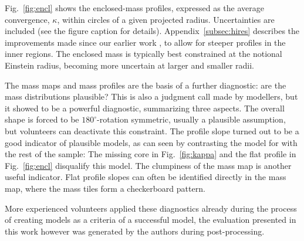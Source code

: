 Fig.~\ref{fig:encl} shows the enclosed-mass profiles, expressed as the
average convergence, $\kappa$, within circles of a given projected
radius.  Uncertainties are included (see the figure caption for
details).
Appendix~\ref{subsec:hires} describes the improvements made
since our earlier work \citep{2015MNRAS.447.2170K}, to allow for
steeper profiles in the inner regions.  The enclosed mass is typically
best constrained at the notional Einstein radius, becoming more
uncertain at larger and smaller radii.

The mass maps and mass profiles are the basis of a further diagnostic:
are the mass distributions plausible? This is also a judgment call
made by modellers, but it showed to be a powerful diagnostic,
summarizing three aspects. The overall shape is forced to be
$180^\circ$-rotation symmetric, usually a plausible assumption, but
volunteers can deactivate this constraint. The profile slope turned
out to be a good indicator of plausible models, as can seen by
contrasting the model for  with the rest of the sample:  The missing
core in Fig.~\ref{fig:kappa} and the flat profile in
Fig.~\ref{fig:encl} disqualify this model. The clumpiness of the
mass map is another useful indicator. Flat profile slopes can often be
identified directly in the mass map, where the mass tiles form a
checkerboard pattern.

More experienced volunteers applied these diagnostics already during the 
process of creating models as a criteria of a successful model, the evaluation 
presented in this work however was generated by the authors during
post-processing.



